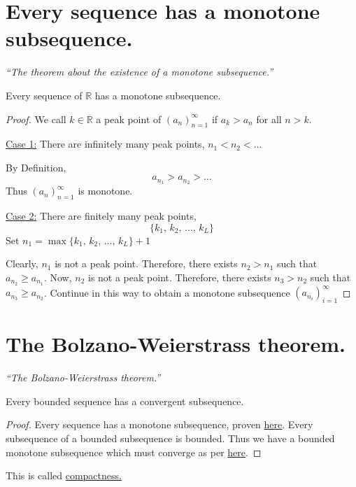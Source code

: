 \documentclass[12pt]{report}
\begin{document}
    \section{Every sequence has a monotone subsequence.}
    \label{Every sequence has a monotone subsequence}
    \textit{``The theorem about the existence of a monotone subsequence.''} \vspace{3mm}
    \begin{theorem}
        Every sequence of \(\mathbb{R}\) has a monotone subsequence.
    \end{theorem}
    \begin{proof}
        We call \(k \in \mathbb{R}\) a peak point of \(\left(a_n\right)^\infty _{n=1}\) if \(a_k > a_n\) for all \(n >k\).
        
        \underline{Case 1:}
        There are infinitely many peak points, \(n_1 < n_2 < \dots \)
        \vspace{5mm}

        By Definition,
        \[a_{n_1} > a_{n_2} > \dots\]
        Thus \(\left(a_n\right)^\infty _{n=1}\) is monotone.
        \vspace{10mm}

        \underline{Case 2:}
        There are finitely many peak points,
        \[\{k_1, \, k_2, \, \dots , \, k_L\}\]
        Set \(n_1 = \max \{k_1, \, k_2, \, \dots , \, k_L\} + 1\)

        Clearly, \(n_1\) is not a peak point. Therefore, there exists \(n_2 > n_1\) such that \(a_{n_2} \geq a_{n_1}\). Now, \(n_2\) is not a peak point. Therefore, there exists \(n_3 > n_2\) such that \(a_{n_3} \geq a_{n_2}\). Continue in this way to obtain a monotone subsequence \(\left(a_{n_i}\right)^\infty _{i=1}\)
    \end{proof}\newpage
    \section{The Bolzano-Weierstrass theorem.}
    \textit{``The Bolzano-Weierstrass theorem.''} \vspace{3mm}
    \begin{theorem}
        Every bounded sequence has a convergent subsequence.
    \end{theorem}
    \begin{proof}
        Every sequence has a monotone subsequence, proven \hyperref[Every sequence has a monotone subsequence]{here}. Every subsequence of a bounded subsequence is bounded. Thus we have a bounded monotone subsequence which must converge as per \hyperref[Convergence of a bounded, monotone sequence]{here}.
    \end{proof}
    \begin{remark}
        This is called \underline{compactness.}
    \end{remark}
\end{document}
